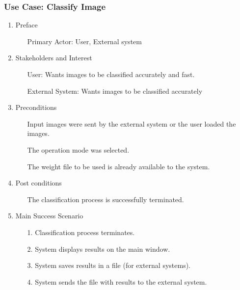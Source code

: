 \documentclass[parskip=full]{scrartcl}
\begin{document}
\pagebreak



\subsubsection {Use Case: Classify Image}

\begin{enumerate}
	\item Preface
	\begin{itemize} [nosep]
		\item[] Primary Actor: User, External system
	\end{itemize}
	\item Stakeholders and Interest
	\begin{itemize} [nosep]
		\item[] User: Wants images to be classified accurately and fast.
		\item[] External System: Wants images to be classified accurately
	\end{itemize}
	\item Preconditions
	\begin{itemize} [nosep]
		\item[] Input images were sent by the external system or the user loaded the images.
		\item[] The operation mode was selected.
		\item[] The weight file to be used is already available to the system.
	\end{itemize}
	\item Post conditions
	\begin{itemize} [nosep]
		\item[] The classification process is successfully terminated.
	\end{itemize}
	\item Main Success Scenario
	\begin{itemize} [nosep]
		\item[1.] Classification process terminates.
		\item[2.] System displays results on the main window.
		\item[3.] System saves results in a file (for external systems).
		\item[4.] System sends the file with results to the external system.
	\end{itemize}

\pagebreak


\end{enumerate}
\end{document}
